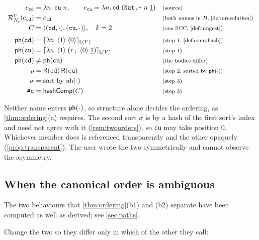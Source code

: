 \documentclass[11pt]{article}
\theoremstyle{definition}
\theoremstyle{plain}
\theoremstyle{remark}
\begin{document}
\[
\begin{array}{r@{\;}l@{\quad}l}
  e_{\texttt{cd}} &= \ulam{n}{\uapp{\uvar{\texttt{cu}}}{\uvar{n}}},
  \qquad
  e_{\texttt{cu}} = \ulam{n}{\uapp{\uvar{\texttt{cd}}}{(\uapp{\uapp{\uvar{\texttt{Nat.+}}}{\uvar n}}{\unat 1})}}
    & \just{source} \\[3pt]
  \Res{V}{\UNames}(e_{\texttt{cd}}) &= e_{\texttt{cd}}
    & \just{both names in $B$, \cref{def:uresolution}} \\[3pt]
  C &= \langle(\texttt{cd}, \cdot), (\texttt{cu}, \cdot)\rangle,\quad k = 2
    & \just{one SCC, \cref{def:uingest}} \\[6pt]
  \phash{\texttt{cd}} &= \uhash{\mathsf{L}(V)}{\ulam{n}{\uapp{\langle 1\rangle}{\langle 0\rangle}}}
    & \just{step 1, \cref{def:comphash}} \\[3pt]
  \phash{\texttt{cu}} &= \uhash{\mathsf{L}(V)}{\ulam{n}{\uapp{\langle 1\rangle}{(\uapp{\uapp{\uref{r_{+}}}{\langle 0\rangle}}{\unat 1})}}}
    & \just{step 1} \\[3pt]
  \phash{\texttt{cd}} &\neq \phash{\texttt{cu}}
    & \just{the bodies differ} \\[3pt]
  \HEnv &= \mathsf{R}(\texttt{cd})\,\mathsf{R}(\texttt{cu})
    & \just{step 2, sorted by $\phash{\cdot}$} \\[3pt]
  \sigma &= \text{sort by } \nhash{\cdot}
    & \just{step 3} \\[3pt]
  \texttt{\#c} &= \comphash(C)
    & \just{step 3}
\end{array}
\]

Neither name enters $\mathsf{ph}(\cdot)$, so structure alone decides the ordering, as
\cref{thm:ordering}(a) requires. The second sort $\sigma$ is by a hash of the first sort's index and
need not agree with it (\cref{rem:twoorders}), so \texttt{cu} may take position $0$. Whichever member
does is referenced transparently and the other opaquely (\cref{prop:transparent}). The user wrote the
two symmetrically and cannot observe the asymmetry.

\subsection{When the canonical order is ambiguous}\label{ex:ambiguous}

The two behaviours that \cref{thm:ordering}(b1) and (b2) separate have been computed as well as
derived; see \cref{sec:paths}.

Change the two so they differ only in which of the other they call:
\end{document}
